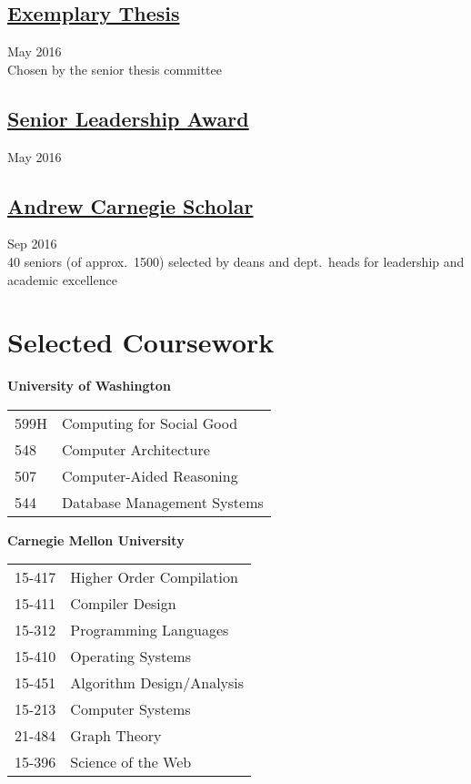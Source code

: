 \documentclass{article}
\begin{document}
\subsection{
  \href{http://www.cs.cmu.edu/~fp/students.html\#honors}
  {Exemplary Thesis}}
\hfill May 2016 \\
Chosen by the senior thesis committee

\subsection{
  \href{https://www.cmu.edu/student-affairs/slice/leadership/senior-leader-recognition.html}
  {Senior Leadership Award}}
\hfill May 2016

\subsection{
  \href{http://www.giving.cmu.edu/s/1410/giving/index.aspx?sid=1410&gid=1&pgid=416}
  {Andrew Carnegie Scholar}}
\hfill Sep 2016 \\
40 seniors (of approx.~1500) selected by deans and dept.\ heads for leadership and academic excellence

\section{Selected Coursework}


\begin{minipage}[t]{0.45\linewidth}
  \raggedright
  \textbf{University of Washington}
  \begin{tabular}{ll}
    599H & Computing for Social Good \\
    548 & Computer Architecture \\
    507 & Computer-Aided Reasoning \\
    544 & Database Management Systems \\
  \end{tabular}
\end{minipage}
\hfill
\begin{minipage}[t]{0.45\linewidth}
  \raggedright
  \textbf{Carnegie Mellon University}
  \begin{tabular}{ll}
    15-417 & Higher Order Compilation  \\
    15-411 & Compiler Design                 \\
    15-312 & Programming Languages           \\
    15-410 & Operating Systems               \\
    15-451 & Algorithm Design/Analysis   \\
    15-213 & Computer Systems                \\
    21-484 & Graph Theory                    \\
    15-396 & Science of the Web              \\
  \end{tabular}
\end{minipage}
\end{document}
